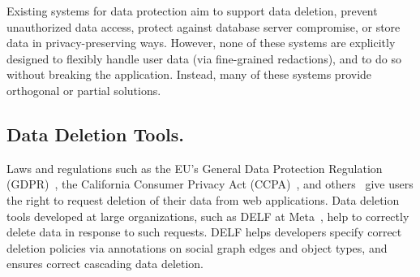 \let\rwhighlight\relax

\begin{comment}
\begin{figure}[t]
    \centering
    \small
    \begin{tabular}{m{0.23\linewidth}|m{0.19\linewidth}|m{0.19\linewidth}|>{\RaggedRight\arraybackslash}m{0.19\linewidth}} %
        \multirow{2}{*}{\centering\textbf{System}} &
            \multicolumn{3}{c}{\textbf{User $u$'s data is protected against...}}\\
        \cline{2-4}
            & \emph{SQL injection}
            & \emph{Compromised user $\neq u$}
            & \emph{Server compromise} \\
        \hline
        Qapla~\cite{qapla} & \hfil \checkmark & & \\
        \hline
        CryptDB~\cite{cryptdb} & \hfil \checkmark & & \hfil \checkmark \\
    \end{tabular}
    \caption{Threats protected against by different classes of systems.}
    \label{tab:related_threats}
\end{figure}
\end{comment}

%
%
Existing systems for data protection aim to support data deletion, prevent
unauthorized data access, protect against database server compromise, or store
data in privacy-preserving ways.
%
However, none of these systems are explicitly designed to flexibly handle user
data (via fine-grained redactions), and to do so without breaking
the application. Instead, many of these systems provide orthogonal or partial
solutions.

\subsection{Data Deletion Tools.}
Laws and regulations such as the EU's General Data Protection Regulation
(GDPR)~\cite{eu:gdpr}, the California Consumer Privacy Act (CCPA)~\cite{ccpa},
and others~\cite{va:privacy-act, china:gdpr-like} give users the right to
request deletion of their data from web applications.
%
Data deletion tools developed at large organizations, such as DELF at
Meta~\cite{delf}, help to correctly delete data in response to such requests.
%
DELF helps developers specify correct deletion policies via annotations on
social graph edges and object types, and ensures correct cascading data
deletion.



